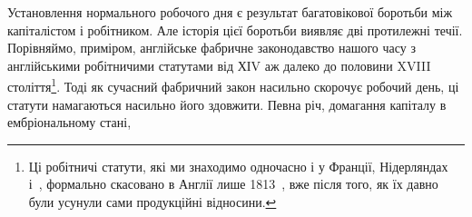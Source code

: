 Установлення нормального робочого дня є результат багатовікової
боротьби між капіталістом і робітником. Але історія цієї
боротьби виявляє дві протилежні течії. Порівняймо, приміром,
англійське фабричне законодавство нашого часу з англійськими
робітничими статутами від ХІV аж далеко до половини XVIII
століття\footnote{Ці робітничі статути, які ми знаходимо одночасно і у Франції,
Нідерляндах і~, формально скасовано в Англії лише 1813~, вже після
того, як їх давно були усунули сами продукційні відносини.}. Тоді як сучасний фабричний закон насильно скорочує
робочий день, ці статути намагаються насильно його здовжити.
Певна річ, домагання капіталу в ембріональному стані,
\parbreak{}  %
